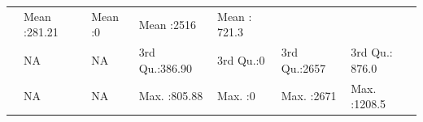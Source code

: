 \documentclass[]{article}
\begin{document}
\begin{longtable}[]{@{}lllllll@{}}
\begin{minipage}[t]{0.15\columnwidth}
\end{minipage} & \begin{minipage}[t]{0.13\columnwidth}\raggedright\strut
Mean :281.21\strut
\end{minipage} & \begin{minipage}[t]{0.10\columnwidth}\raggedright\strut
Mean :0\strut
\end{minipage} & \begin{minipage}[t]{0.12\columnwidth}\raggedright\strut
Mean :2516\strut
\end{minipage} & \begin{minipage}[t]{0.13\columnwidth}\raggedright\strut
Mean : 721.3\strut
\end{minipage}\tabularnewline
\begin{minipage}[t]{0.03\columnwidth}\raggedright\strut
\strut
\end{minipage} & \begin{minipage}[t]{0.14\columnwidth}\raggedright\strut
NA\strut
\end{minipage} & \begin{minipage}[t]{0.15\columnwidth}\raggedright\strut
NA\strut
\end{minipage} & \begin{minipage}[t]{0.13\columnwidth}\raggedright\strut
3rd Qu.:386.90\strut
\end{minipage} & \begin{minipage}[t]{0.10\columnwidth}\raggedright\strut
3rd Qu.:0\strut
\end{minipage} & \begin{minipage}[t]{0.12\columnwidth}\raggedright\strut
3rd Qu.:2657\strut
\end{minipage} & \begin{minipage}[t]{0.13\columnwidth}\raggedright\strut
3rd Qu.: 876.0\strut
\end{minipage}\tabularnewline
\begin{minipage}[t]{0.03\columnwidth}\raggedright\strut
\strut
\end{minipage} & \begin{minipage}[t]{0.14\columnwidth}\raggedright\strut
NA\strut
\end{minipage} & \begin{minipage}[t]{0.15\columnwidth}\raggedright\strut
NA\strut
\end{minipage} & \begin{minipage}[t]{0.13\columnwidth}\raggedright\strut
Max. :805.88\strut
\end{minipage} & \begin{minipage}[t]{0.10\columnwidth}\raggedright\strut
Max. :0\strut
\end{minipage} & \begin{minipage}[t]{0.12\columnwidth}\raggedright\strut
Max. :2671\strut
\end{minipage} & \begin{minipage}[t]{0.13\columnwidth}\raggedright\strut
Max. :1208.5\strut
\end{minipage}\tabularnewline
\bottomrule
\end{longtable}
\end{document}
